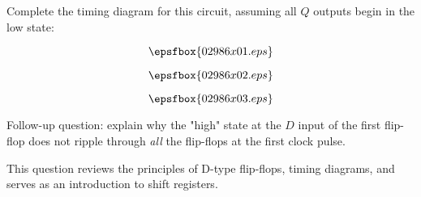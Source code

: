

Complete the timing diagram for this circuit, assuming all $Q$ outputs begin in the low state:

$$\epsfbox{02986x01.eps}$$

$$\epsfbox{02986x02.eps}$$







$$\epsfbox{02986x03.eps}$$

\vskip 10pt

Follow-up question: explain why the "high" state at the $D$ input of the first flip-flop does not ripple through {\it all} the flip-flops at the first clock pulse.







This question reviews the principles of D-type flip-flops, timing diagrams, and serves as an introduction to shift registers.




